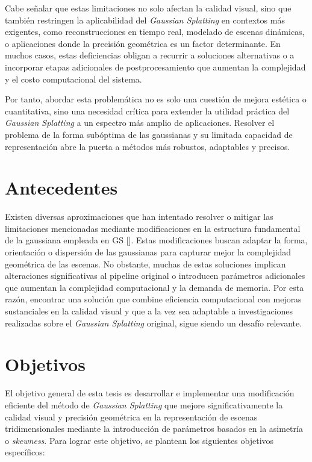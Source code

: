 Cabe señalar que estas limitaciones no solo afectan la calidad visual, sino que también restringen la aplicabilidad del \textit{Gaussian Splatting} en 
contextos más exigentes, como reconstrucciones en tiempo real, modelado de escenas dinámicas, o aplicaciones donde la precisión geométrica es 
un factor determinante. En muchos casos, estas deficiencias obligan a recurrir a soluciones alternativas o a incorporar etapas adicionales de 
postprocesamiento que aumentan la complejidad y el costo computacional del sistema.

Por tanto, abordar esta problemática no es solo una cuestión de mejora estética o cuantitativa, sino una necesidad crítica para extender la 
utilidad práctica del \textit{Gaussian Splatting} a un espectro más amplio de aplicaciones. Resolver el problema de la forma subóptima de las gaussianas 
y su limitada capacidad de representación abre la puerta a métodos más robustos, adaptables y precisos.

\section{Antecedentes}
Existen diversas aproximaciones que han intentado resolver o mitigar las limitaciones mencionadas mediante modificaciones en la estructura 
fundamental de la gaussiana empleada en GS 
[\cite{qu2024discgsdiscontinuityawaregaussiansplatting, li20243d, huang2025deformableradialkernelsplatting,held20243dconvexsplattingradiance}]. 
Estas modificaciones buscan adaptar la forma, orientación o dispersión de las gaussianas para capturar mejor la complejidad geométrica de las escenas. 
No obstante, muchas de estas soluciones implican alteraciones significativas al pipeline original o introducen parámetros adicionales que aumentan la 
complejidad computacional y la demanda de memoria. 
Por esta razón, encontrar una solución que combine eficiencia computacional con mejoras sustanciales en la calidad visual y que a la vez sea adaptable 
a investigaciones realizadas sobre el \textit{Gaussian Splatting} original, sigue siendo un desafío relevante.

\section{Objetivos}

El objetivo general de esta tesis es desarrollar e implementar una modificación eficiente del método de \textit{Gaussian Splatting} 
que mejore significativamente la calidad visual y precisión geométrica en la representación de escenas tridimensionales mediante la 
introducción de parámetros basados en la asimetría o \textit{skewness}. 
Para lograr este objetivo, se plantean los siguientes objetivos específicos:

